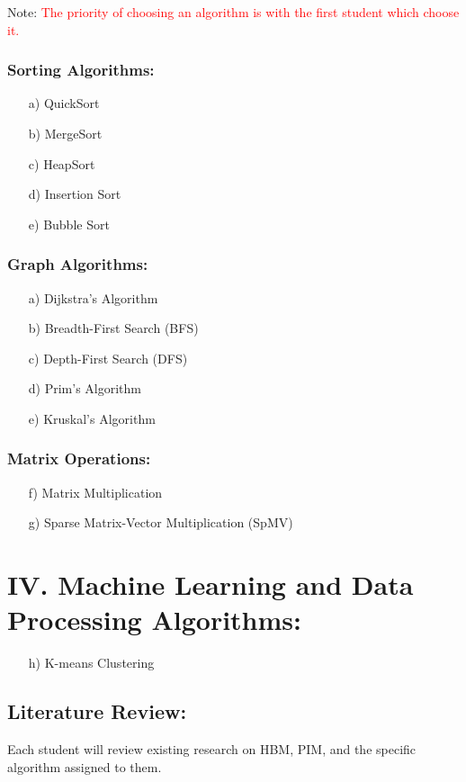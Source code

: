 \documentclass[12pt]{article}
\begin{document}
Note: \textcolor{red}{The priority of choosing an algorithm is with the first student which choose it.}


\subsubsection{Sorting Algorithms:}
\begin{enumerate}
	\item[a)] QuickSort
	\item[b)] MergeSort
	\item[c)] HeapSort
	\item[d)] Insertion Sort
	\item[e)] Bubble Sort
\end{enumerate}

\subsubsection{Graph Algorithms:}
\begin{enumerate}
	\item[a)] Dijkstra's Algorithm
	\item[b)] Breadth-First Search (BFS)
	\item[c)] Depth-First Search (DFS)
	\item[d)] Prim's Algorithm
	\item[e)] Kruskal's Algorithm
\end{enumerate}

\subsubsection{Matrix Operations:}
\begin{enumerate}
	\item[f)] Matrix Multiplication
	\item[g)] Sparse Matrix-Vector Multiplication (SpMV)
\end{enumerate}

\section*{IV. Machine Learning and Data Processing Algorithms:}
\begin{enumerate}
	\item[h)] K-means Clustering
\end{enumerate}


\subsection{Literature Review:}
Each student will review existing research on HBM, PIM, and the specific algorithm assigned to them.
\end{document}
